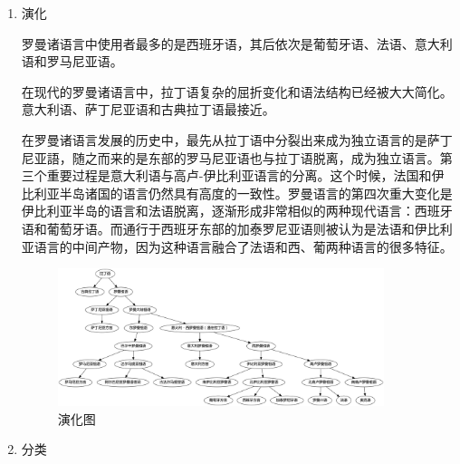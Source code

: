 \documentclass[UTF8,a4paper,titlepage,10pt]{report}
\begin{document}
\begin{enumerate}
\item 演化
\label{sec:orga9625ba}

罗曼诸语言中使用者最多的是西班牙语，其后依次是葡萄牙语、法语、意大利语和罗马尼亚语。

在现代的罗曼诸语言中，拉丁语复杂的屈折变化和语法结构已经被大大简化。意大利语、萨丁尼亚语和古典拉丁语最接近。

在罗曼诸语言发展的历史中，最先从拉丁语中分裂出来成为独立语言的是萨丁尼亚語，随之而来的是东部的罗马尼亚语也与拉丁语脱离，成为独立语言。第三个重要过程是意大利语与高卢-伊比利亚语言的分离。这个时候，法国和伊比利亚半岛诸国的语言仍然具有高度的一致性。罗曼语言的第四次重大变化是伊比利亚半岛的语言和法语脱离，逐渐形成非常相似的两种现代语言：西班牙语和葡萄牙语。而通行于西班牙东部的加泰罗尼亚语则被认为是法语和伊比利亚语言的中间产物，因为这种语言融合了法语和西、葡两种语言的很多特征。

\begin{figure}[H]
\centering
\includegraphics[width=0.9\textwidth]{images/Family.png}
\caption{\label{fig:org6c88b8a}
演化图}
\end{figure}

\item 分类
\label{sec:org4bcc651}


\end{enumerate}
\end{document}
